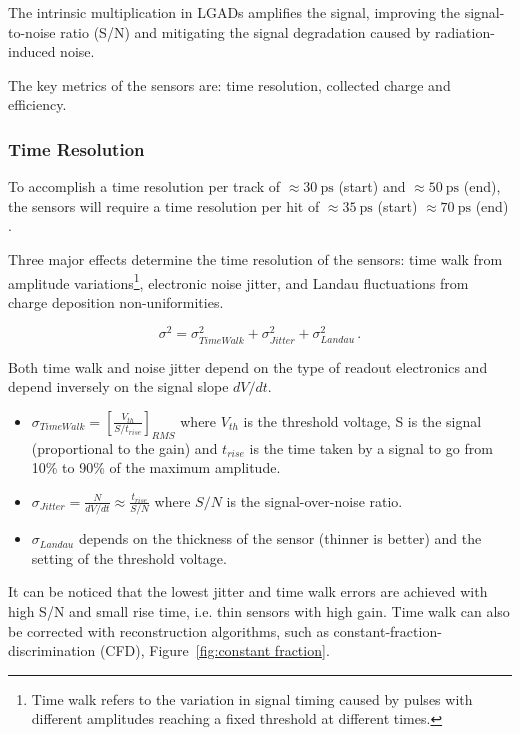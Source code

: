 The intrinsic multiplication in LGADs amplifies the signal, improving the signal-to-noise ratio (S/N) and mitigating the signal degradation caused by radiation-induced noise.

The key metrics of the sensors are: time resolution, collected charge and efficiency.

\subsubsection{Time Resolution}

To accomplish a time resolution per track of $\approx\qty{30}{\pico\second}$ (start) and $\approx\qty{50}{\pico\second}$ (end), the sensors will require a time resolution per hit of $\approx\qty{35}{\pico\second}$ (start) $\approx\qty{70}{\pico\second}$ (end) \cite{CERN-LHCC-2020-007}.

Three major effects determine the time resolution of the sensors: time walk from amplitude variations\footnote{Time walk refers to the variation in signal timing caused by pulses with different amplitudes reaching a fixed threshold at different times.}, electronic noise jitter, and Landau fluctuations from charge deposition non-uniformities. 

\begin{equation}\label{eq:time_resoltuion_LGADs}
    \sigma^2 = \sigma_{TimeWalk}^2 + \sigma_{Jitter}^2 + \sigma_{Landau}^2  \, .
\end{equation}

 Both time walk and noise jitter depend on the type of readout electronics and depend inversely on the signal slope $dV/dt$.

\begin{itemize}
    \item $\sigma_{TimeWalk} = \left[ \frac{V_{th}}{S/t_{rise}}\right]_{RMS}$ where $V_{th}$ is the threshold voltage, S is the signal (proportional to the gain) and $t_{rise}$ is the time taken by a signal to go from 10\% to 90\% of the maximum amplitude.
    \item $\sigma_{Jitter} = \frac{N}{dV/dt} \approx \frac{t_{rise}}{S/N}$ where $S/N$ is the signal-over-noise ratio.
    \item $\sigma_{Landau}$ depends on the thickness of the sensor (thinner is better) and the setting of the threshold voltage.
\end{itemize}

It can be noticed that the lowest jitter and time walk errors are achieved with high S/N and small rise time, i.e. thin sensors with high gain. Time walk can also be corrected with reconstruction algorithms, such as constant-fraction-discrimination (CFD), Figure~\ref{fig:constant fraction}.

